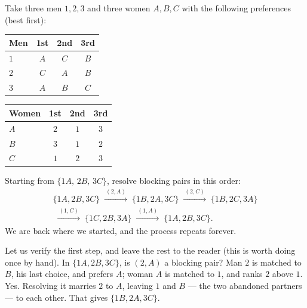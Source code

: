 \begin{example}\label{ex:sm-cycle}
Take three men $1,2,3$ and three women $A,B,C$ with the following preferences
(best first):
\begin{center}
\begin{tabular}{@{}lccc@{}}
\toprule
\textbf{Men} & 1st & 2nd & 3rd \\
\midrule
$1$ & $A$ & $C$ & $B$ \\
$2$ & $C$ & $A$ & $B$ \\
$3$ & $A$ & $B$ & $C$ \\
\bottomrule
\end{tabular}
\hspace{2em}
\begin{tabular}{@{}lccc@{}}
\toprule
\textbf{Women} & 1st & 2nd & 3rd \\
\midrule
$A$ & $2$ & $1$ & $3$ \\
$B$ & $3$ & $1$ & $2$ \\
$C$ & $1$ & $2$ & $3$ \\
\bottomrule
\end{tabular}
\end{center}
Starting from $\{1A,\,2B,\,3C\}$, resolve blocking pairs in this order:
\begin{gather*}
\{1A,2B,3C\}
\;\xrightarrow{\ (2,A)\ }\;
\{1B,2A,3C\}
\;\xrightarrow{\ (2,C)\ }\;
\{1B,2C,3A\}\\[0.3em]
\;\xrightarrow{\ (1,C)\ }\;
\{1C,2B,3A\}
\;\xrightarrow{\ (1,A)\ }\;
\{1A,2B,3C\}.
\end{gather*}
We are back where we started, and the process repeats forever.
\end{example}

Let us verify the first step, and leave the rest to the reader (this is worth
doing once by hand). In $\{1A,2B,3C\}$, is $(2,A)$ a blocking pair? Man $2$ is
matched to $B$, his last choice, and prefers $A$; woman $A$ is matched to $1$,
and ranks $2$ above $1$. Yes. Resolving it marries $2$ to $A$, leaving $1$ and
$B$ --- the two abandoned partners --- to each other. That gives
$\{1B, 2A, 3C\}$.

